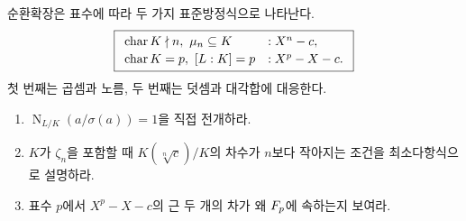 \begin{keyidea}
순환확장은 표수에 따라 두 가지 표준방정식으로 나타난다.
\[
  \boxed{
  \begin{array}{ll}
  \operatorname{char} K\nmid n,\ \mu_n\subseteq K
    &: X^n-c,\\[2pt]
  \operatorname{char} K=p,\ [L:K]=p
    &: X^p-X-c.
  \end{array}}
\]
첫 번째는 곱셈과 노름, 두 번째는 덧셈과 대각합에 대응한다.
\end{keyidea}

\begin{checkpoint}
\begin{enumerate}[label=(\alph*)]
  \item $\operatorname N_{L/K}(a/\sigma(a))=1$을 직접 전개하라.
  \item $K$가 $\zeta_n$을 포함할 때 $K(\sqrt[n]{c})/K$의 차수가 $n$보다 작아지는 조건을 최소다항식으로 설명하라.
  \item 표수 $p$에서 $X^p-X-c$의 근 두 개의 차가 왜 $F_p$에 속하는지 보여라.
\end{enumerate}
\end{checkpoint}
